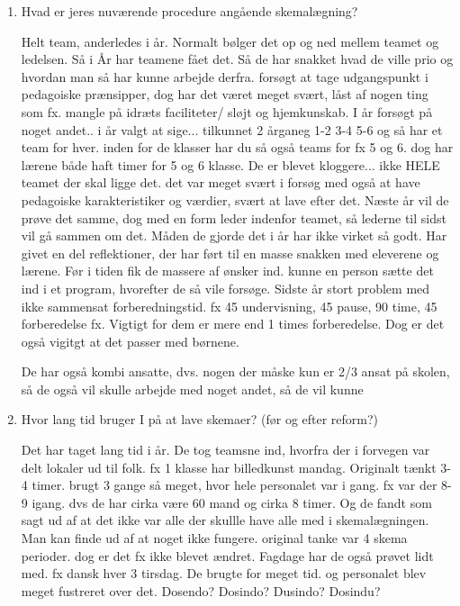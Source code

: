 \begin{enumerate}
	\item Hvad er jeres nuværende procedure angående skemalægning?

	Helt team, anderledes i år. Normalt bølger det op og ned mellem teamet  og ledelsen. Så i År har teamene fået det. Så de har snakket hvad de ville prio og hvordan man så har kunne arbejde derfra. forsøgt at tage udgangspunkt i pedagoiske prænsipper, dog har det været meget svært, låst af nogen ting som fx. mangle på idræts faciliteter/ sløjt og hjemkunskab. I år forsøgt på noget andet.. i år valgt at sige... tilkunnet 2 årganeg 1-2 3-4 5-6 og så har et team for hver. inden for de klasser har du så også teams for fx 5 og 6. dog har lærene både haft timer for 5 og 6 klasse. De er blevet kloggere... ikke HELE teamet der skal ligge det. det var meget svært i forsøg med også at have pedagoiske karakteristiker og værdier, svært at lave efter det. Næste år vil de prøve det samme, dog med en form leder indenfor teamet, så lederne til sidst vil gå sammen om det. Måden de gjorde det i år har ikke virket så godt. Har givet en del reflektioner, der har ført til en masse snakken med eleverene og lærene. Før i tiden fik de massere af ønsker ind. kunne en person sætte det ind i et program, hvorefter de så vile forsøge. Sidste år stort problem med ikke sammensat forberedningstid. fx 45 undervisning, 45 pause, 90 time, 45 forberedelse fx. Vigtigt for dem er mere end 1 times forberedelse. Dog er det også vigitgt at det passer med børnene. 

De har også kombi ansatte, dvs. nogen der måske kun er 2/3 ansat på skolen, så de også vil skulle arbejde med noget andet, så de vil kunne   	
	
	\item Hvor lang tid bruger I på at lave skemaer? (før og efter reform?)
	
	Det har taget lang tid i år. De tog teamsne ind, hvorfra der i forvegen var delt lokaler ud til folk. fx 1 klasse har billedkunst mandag. Originalt tænkt 3-4 timer. brugt 3 gange så meget, hvor hele personalet var i gang. fx var der 8-9 igang. dvs de har cirka være 60 mand og cirka 8 timer. Og de fandt som sagt ud af at det ikke var alle der skullle have alle med i skemalægningen. Man kan finde ud af at noget ikke fungere. original tanke var 4 skema perioder. dog er det fx ikke blevet ændret. Fagdage har de også prøvet lidt med. fx dansk hver 3 tirsdag. De brugte for meget tid. og personalet blev meget fustreret over det. Dosendo? Dosindo? Dusindo? Dosindu? 


\end{enumerate}
